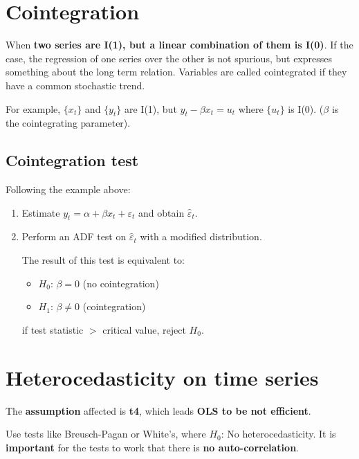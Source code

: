 \documentclass[10pt, a4paper, landscape]{article}
\begin{document}
\begin{multicols}{3}
		\section*{Cointegration}
		
		When \textbf{two series are I(1), but a linear combination of them is I(0)}. If the case, the regression of one series over the other is not spurious, but expresses something about the long term relation. Variables are called cointegrated if they have a common stochastic trend.
		
		For example, $\lbrace x_{t} \rbrace$ and $\lbrace y_{t} \rbrace$ are I(1), but $y_{t} - \beta x_{t} = u_{t}$ where $\lbrace u_{t} \rbrace$ is I(0). ($\beta$ is the cointegrating parameter).

		\subsection*{Cointegration test}
		
		Following the example above:
		
		\begin{enumerate}[leftmargin=*]
			\item Estimate $y_{t} = \alpha + \beta x_{t} + \varepsilon_{t}$ and obtain $\hat{\varepsilon}_{t}$.
			\item Perform an ADF test on $\hat{\varepsilon}_{t}$ with a modified distribution.
			
			The result of this test is equivalent to:
			
			\begin{itemize}[leftmargin=*]
				\item $H_{0}$: $\beta = 0$ (no cointegration)
				\item $H_{1}$: $\beta \neq 0$ (cointegration)
			\end{itemize}
			
			if test statistic $>$ critical value, reject $H_0$.
		\end{enumerate}
		
		\section*{Heterocedasticity on time series}
		
		The \textbf{assumption} affected is \textbf{t4}, which leads \textbf{OLS to be not efficient}.
		
		Use tests like Breusch-Pagan or White's, where $H_{0}$: No heterocedasticity. It is \textbf{important} for the tests to work that there is \textbf{no auto-correlation}.
		

\end{multicols}
\end{document}
